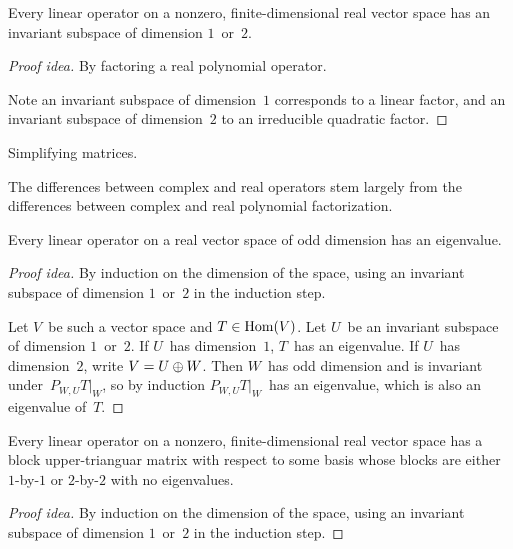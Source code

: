 \begin{thm}
Every linear operator on a nonzero, finite-dimensional real vector space has an invariant subspace of dimension \(1\)~or~\(2\).
\end{thm}
\begin{proof}[Proof idea]
By factoring a real polynomial operator.

Note an invariant subspace of dimension~\(1\) corresponds to a linear factor, and an invariant subspace of dimension~\(2\) to an irreducible quadratic factor.
\end{proof}
\begin{app}
Simplifying matrices.
\end{app}

\begin{rmk}
The differences between complex and real operators stem largely from the differences between complex and real polynomial factorization.
\end{rmk}

\begin{cor}
Every linear operator on a real vector space of odd dimension has an eigenvalue.
\end{cor}
\begin{proof}[Proof idea]
By induction on the dimension of the space, using an invariant subspace of dimension \(1\)~or~\(2\) in the induction step.

Let \(V\)~be such a vector space and \(T\in\operatorname{Hom}(V)\). Let \(U\)~be an invariant subspace of dimension \(1\)~or~\(2\). If \(U\)~has dimension~\(1\), \(T\)~has an eigenvalue. If \(U\)~has dimension~\(2\), write \(V=U\oplus W\). Then \(W\)~has odd dimension and is invariant under~\(P_{W,U}T|_W\), so by induction \(P_{W,U}T|_W\)~has an eigenvalue, which is also an eigenvalue of~\(T\).
\end{proof}

\begin{cor}
Every linear operator on a nonzero, finite-dimensional real vector space has a block upper-trianguar matrix with respect to some basis whose blocks are either \(1\)-by-\(1\) or \(2\)-by-\(2\) with no eigenvalues.
\end{cor}
\begin{proof}[Proof idea]
By induction on the dimension of the space, using an invariant subspace of dimension \(1\)~or~\(2\) in the induction step.
\end{proof}

